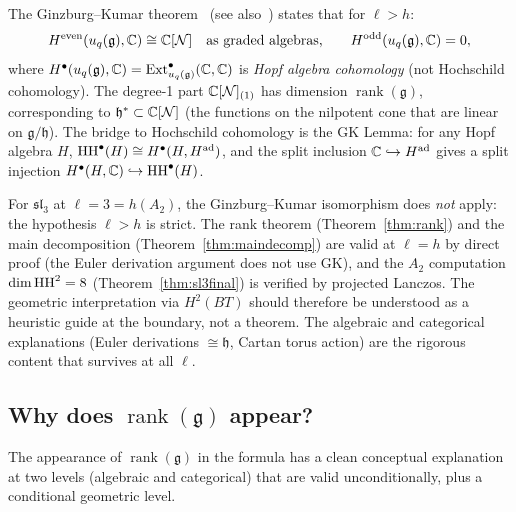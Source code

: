 \begin{remark}
The Ginzburg--Kumar theorem~\cite{GK93} (see also~\cite{BNPP, HV22}) states that for $\ell > h$:
\[
H^{\mathrm{even}}(u_q(\mathfrak{g}), \mathbb{C}) \cong \mathbb{C}[\mathcal{N}] \quad \text{as graded algebras,} \qquad H^{\mathrm{odd}}(u_q(\mathfrak{g}), \mathbb{C}) = 0,
\]
where $H^\bullet(u_q(\mathfrak{g}), \mathbb{C}) = \operatorname{Ext}^\bullet_{u_q(\mathfrak{g})}(\mathbb{C}, \mathbb{C})$ is \emph{Hopf algebra cohomology} (not Hochschild cohomology). The degree-1 part $\mathbb{C}[\mathcal{N}]_{(1)}$ has dimension $\operatorname{rank}(\mathfrak{g})$, corresponding to $\mathfrak{h}^* \subset \mathbb{C}[\mathcal{N}]$ (the functions on the nilpotent cone that are linear on $\mathfrak{g}/\mathfrak{h}$). The bridge to Hochschild cohomology is the GK Lemma: for any Hopf algebra $H$, $\operatorname{HH}^\bullet(H) \cong H^\bullet(H, H^{\mathrm{ad}})$, and the split inclusion $\mathbb{C} \hookrightarrow H^{\mathrm{ad}}$ gives a split injection $H^\bullet(H, \mathbb{C}) \hookrightarrow \operatorname{HH}^\bullet(H)$.
\end{remark}

\begin{remark}[The boundary case $\ell = h$]
For $\mathfrak{sl}_3$ at $\ell = 3 = h(A_2)$, the Ginzburg--Kumar isomorphism does \emph{not} apply: the hypothesis $\ell > h$ is strict. The rank theorem (Theorem~\ref{thm:rank}) and the main decomposition (Theorem~\ref{thm:maindecomp}) are valid at $\ell = h$ by direct proof (the Euler derivation argument does not use GK), and the $A_2$ computation $\dim \operatorname{HH}^2 = 8$ (Theorem~\ref{thm:sl3final}) is verified by projected Lanczos. The geometric interpretation via $H^2(BT)$ should therefore be understood as a heuristic guide at the boundary, not a theorem. The algebraic and categorical explanations (Euler derivations $\cong \mathfrak{h}$, Cartan torus action) are the rigorous content that survives at all $\ell$.
\end{remark}

\subsection{Why does \texorpdfstring{$\operatorname{rank}(\mathfrak{g})$}{rank(g)} appear?}
\label{sec:whyrank}

The appearance of $\operatorname{rank}(\mathfrak{g})$ in the formula has a clean conceptual explanation at two levels (algebraic and categorical) that are valid unconditionally, plus a conditional geometric level.

